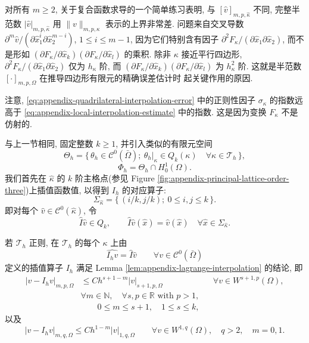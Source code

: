 \setcounter{statement}{2}
\begin{Remark}\label{rem:appendix-quadrilateral-cross-derivatives}
对所有 $m\geq2$, 关于复合函数求导的一个简单练习表明,
与 $[\hat v]_{m,p,\hat\kappa}$ 不同,
完整半范数 $|\hat v|_{m,p,\hat\kappa}$ 用
$\|v\|_{m,p,\kappa}$ 表示的上界非常差.
问题来自交叉导数
$\partial^m\hat v/(\partial\hat x_1^i\partial\hat x_2^{m-i})$,
$1\leq i\leq m-1$, 因为它们特别含有因子
$\partial^2F_\kappa/(\partial\hat x_1\partial\hat x_2)$,
而不是形如
$(\partial F_\kappa/\partial\hat x_k)
(\partial F_\kappa/\partial\hat x_l)$ 的乘积.
除非 $\kappa$ 接近平行四边形,
$\partial^2F_\kappa/(\partial\hat x_1\partial\hat x_2)$
仅为 $h_\kappa$ 阶, 而
$(\partial F_\kappa/\partial\hat x_k)
(\partial F_\kappa/\partial\hat x_l)$ 为 $h_\kappa^2$ 阶.
这就是半范数 $[\cdot]_{m,p,\Omega}$ 在推导四边形有限元的精确误差估计时
起关键作用的原因.
\end{Remark}

\setcounter{statement}{3}
\begin{Remark}\label{rem:appendix-quadrilateral-regularity-exponent}
注意, \eqref{eq:appendix-quadrilateral-interpolation-error}
中的正则性因子 $\sigma_\kappa$ 的指数远高于
\eqref{eq:appendix-local-interpolation-estimate} 中的指数.
这是因为变换 $F_\kappa$ 不是仿射的.
\end{Remark}

与上一节相同, 固定整数 $k\geq1$, 并引入类似的有限元空间
\[
\Theta_h
=
\{\,\theta_h\in\mathcal{C}^0(\bar\Omega);
\ \theta_h|_\kappa\in Q_k(\kappa)
\quad\forall\kappa\in\mathcal{T}_h\,\},
\]
\[
\Phi_h=\Theta_h\cap H_0^1(\Omega).
\]
我们首先在 $\hat\kappa$ 的 $k$ 阶主格点(参见 Figure
\ref{fig:appendix-principal-lattice-order-three})上插值函数值,
以得到 $I_h$ 的对应算子:
\[
\Sigma_{\hat\kappa}
=
\{\,(i/k,j/k);\ 0\leq i,j\leq k\,\}.
\]
即对每个 $\hat v\in\mathcal{C}^0(\hat\kappa)$, 令
\begin{equation}\label{eq:appendix-quadrilateral-lagrange-reference}
\hat I\hat v\in Q_k,
\qquad
\hat I\hat v(\hat x)=\hat v(\hat x)
\quad
\forall\hat x\in\Sigma_{\hat\kappa}.
\end{equation}

若 $\mathcal{T}_h$ 正则, 在 $\mathcal{T}_h$ 的每个 $\kappa$ 上由
\[
\widehat{I_hv}=\hat I\hat v
\qquad
\forall v\in\mathcal{C}^0(\bar\Omega)
\]
定义的插值算子 $I_h$ 满足 Lemma
\ref{lem:appendix-lagrange-interpolation} 的结论, 即
\begin{equation}\label{eq:appendix-quadrilateral-lagrange-error-wsp}
\begin{aligned}
|v-I_hv|_{m,p,\Omega}
&\leq
Ch^{s+1-m}|v|_{s+1,p,\Omega}
&&\forall v\in W^{s+1,p}(\Omega),\\
&\forall m\in\mathbb{N},\quad
\forall s,p\in\mathbb{R}
\text{ with }p>1,\\
&\qquad
0\leq m\leq s+1,\quad
1\leq s\leq k,
\end{aligned}
\end{equation}
以及
\begin{equation}\label{eq:appendix-quadrilateral-lagrange-error-w1q}
|v-I_hv|_{m,q,\Omega}
\leq
Ch^{1-m}|v|_{1,q,\Omega}
\qquad
\forall v\in W^{1,q}(\Omega),
\quad q>2,
\quad m=0,1.
\end{equation}


